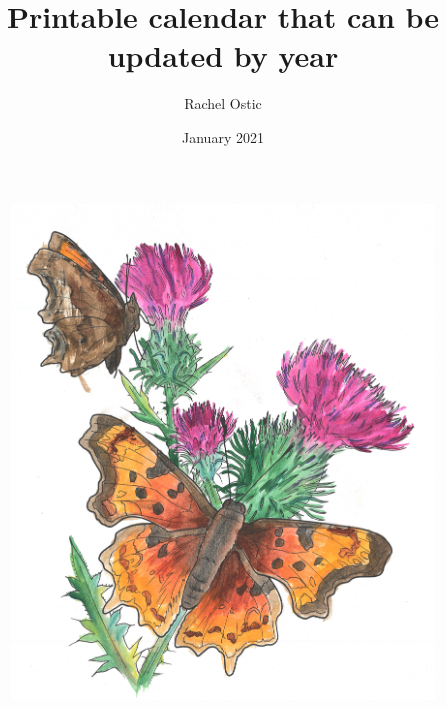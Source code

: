 \documentclass{article}
\title{Printable calendar that can be updated by year}
\author{Rachel Ostic}
\date{January 2021}
\newcommand{\CalendarYear}{}
\begin{document}
 
\begin{center}
 \section*{\CalendarYear } 
\end{center}
 
 \begin{figure}[H]
    \centering
    \includegraphics[width=0.95\linewidth]{images/cover.jpg}
\end{figure}


\makeatletter
\end{document}

